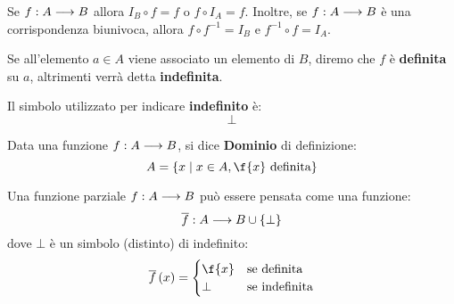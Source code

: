 \documentclass{lectures}
\begin{document}
\begin{multicols}{2}
\begin{definition}
    Se \(f:A\longrightarrow B\) allora \(I_B \circ f = f\) o \(f \circ I_A = f\). Inoltre, se \(f:A\longrightarrow B\) è una corrispondenza biunivoca, allora \(f \circ f^{-1} = I_B\) e \(f^{-1} \circ f = I_A\).
\end{definition}
\begin{definition}
Se all'elemento \(a \in A\) viene associato un elemento di \(B\), diremo che \(f\) è \textbf{definita} su \(a\), altrimenti verrà detta \textbf{indefinita}.
\end{definition}
\begin{definition}[Indefinito]
    Il simbolo utilizzato per indicare \textbf{indefinito} è: \[\bot\]
\end{definition}
\begin{definition}
    Data una funzione \(f:A\longrightarrow B\), si dice \textbf{Dominio} di definizione:
    \[
        A = \crl{x \mid x \in A, \f{x} \text{ definita}}
    \]
\end{definition}
\begin{definition}
    Una funzione parziale \(f:A\longrightarrow B\) può essere pensata come una funzione:
    \[
        \overline{f}:A\longrightarrow B \cup \left\{\bot\right\}
    \]
    dove \(\bot\) è un simbolo (distinto) di indefinito:
    \[
        \bar{f}\rnd{x} = \begin{cases}
            \f{x} & \text{se definita}\\
            \bot & \text{se indefinita}
        \end{cases}
    \]
\end{definition}
\end{multicols}
\clearpage
\end{document}
